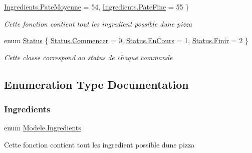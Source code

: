 \begin{DoxyCompactItemize}
\hyperlink{namespaceModele_a001a8e89e56a724f24a249ba98080d41a0e12593fc6254ddd1fa53c6f224f02ac}{Ingredients.\+Pate\+Moyenne} = 54, 
\hyperlink{namespaceModele_a001a8e89e56a724f24a249ba98080d41aa9fdbefcbc305072470326a6de59e0f6}{Ingredients.\+Pate\+Fine} = 55
 \}\begin{DoxyCompactList}\small\item\em Cette fonction contient tout les ingredient possible d\textquotesingle{}une pizza \end{DoxyCompactList}
\item 
enum \hyperlink{namespaceModele_a7de67c7bf55b42ee1c5fea81ed793eb1}{Status} \{ \hyperlink{namespaceModele_a7de67c7bf55b42ee1c5fea81ed793eb1a62c3f6afd773369cfc24fe9e38c2d9a7}{Status.\+Commencer} = 0, 
\hyperlink{namespaceModele_a7de67c7bf55b42ee1c5fea81ed793eb1a999b7e7e3a2fc2f84c2257219b1155ab}{Status.\+En\+Cours} = 1, 
\hyperlink{namespaceModele_a7de67c7bf55b42ee1c5fea81ed793eb1a36595ed9a50ab65eb1dac4ba9f9813ff}{Status.\+Finir} = 2
 \}\begin{DoxyCompactList}\small\item\em Cette classe correspond au status de chaque commande \end{DoxyCompactList}
\end{DoxyCompactItemize}


\subsection{Enumeration Type Documentation}
\mbox{\label{namespaceModele_a001a8e89e56a724f24a249ba98080d41}} 
\subsubsection{\texorpdfstring{Ingredients}{Ingredients}}
{\footnotesize\ttfamily enum \hyperlink{namespaceModele_a001a8e89e56a724f24a249ba98080d41}{Modele.\+Ingredients}\hspace{0.3cm}{\ttfamily [strong]}}



Cette fonction contient tout les ingredient possible d\textquotesingle{}une pizza 

